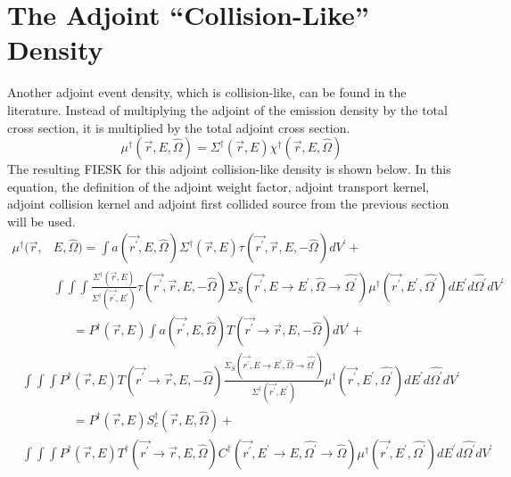 \section{The Adjoint ``Collision-Like'' Density}
Another adjoint event density, which is collision-like, can be found in the 
literature. Instead of multiplying the adjoint of the emission density by the
total cross section, it is multiplied by the total adjoint cross section.
\begin{equation}
  \mu^{\dagger}(\vec{r},E,\hat{\Omega}) = \Sigma^{\dagger}(\vec{r},E)
  \chi^{\dagger}(\vec{r},E,\hat{\Omega})
  \label{eq:adj_collision_like_dens_to_adjoint_of_emission_dens}
\end{equation}
The resulting FIESK for this adjoint collision-like density is shown below.
In this equation, the definition of the adjoint weight factor, adjoint
transport kernel, adjoint collision kernel and adjoint first collided 
source from the previous section will be used.
\begin{equation*}
  \begin{split}
  \mu^{\dagger}(\vec{r},&E,\hat{\Omega}) = \int a(\vec{r^{'}},E,\hat{\Omega}) 
    \Sigma^{\dagger}(\vec{r},E) \tau(\vec{r^{'}},\vec{r},E,-\hat{\Omega}) 
    dV^{'} + \\
    & \int\int\int  \frac{\Sigma^{\dagger}(\vec{r},E)}
    {\Sigma^{\dagger}(\vec{r^{'}},E^{'})}
      \tau(\vec{r^{'}},\vec{r},E,-\hat{\Omega}) 
    \Sigma_S(\vec{r^{'}},E \to E^{'},\hat{\Omega} \to \hat{\Omega^{'}})
    \mu^{\dagger}(\vec{r^{'}},E^{'},\hat{\Omega^{'}}) dE^{'}d\hat{\Omega^{'}}dV^{'}
  \end{split}
\end{equation*}
\begin{equation*}
  \begin{split}
  \text{} & \qquad \qquad = P^{\dagger}(\vec{r},E) \int
    a(\vec{r^{'}},E,\hat{\Omega}) 
    T(\vec{r^{'}} \to \vec{r},E,-\hat{\Omega}) dV^{'} + \\
    & \int\int\int P^{\dagger}(\vec{r},E) 
    T(\vec{r^{'}} \to \vec{r},E,-\hat{\Omega})
      \frac{\Sigma_S(\vec{r^{'}},E \to E^{'},\hat{\Omega} \to \hat{\Omega^{'}})}
           {\Sigma^{\dagger}(\vec{r^{'}},E^{'})}
    \mu^{\dagger}(\vec{r^{'}},E^{'},\hat{\Omega^{'}}) dE^{'}d\hat{\Omega^{'}}dV^{'}
  \end{split}
\end{equation*}
\begin{equation*}
  \begin{split}
    \text{} & \qquad \qquad = P^{\dagger}(\vec{r},E) 
    S_c^{\dagger}(\vec{r},E,\hat{\Omega}) +\\
    & \int\int\int P^{\dagger}(\vec{r},E) 
    T^{\dagger}(\vec{r^{'}} \to \vec{r},E,\hat{\Omega})
    C^{\dagger}(\vec{r^{'}},E^{'} \to E,\hat{\Omega^{'}} \to \hat{\Omega})
    \mu^{\dagger}(\vec{r^{'}},E^{'},\hat{\Omega^{'}}) dE^{'}d\hat{\Omega^{'}}dV^{'}
  \end{split}
\end{equation*}

